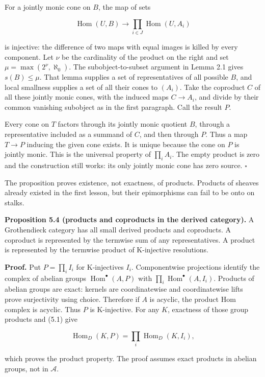 \documentclass[
  english,
  11pt,
  a4paper,
]{article}
\begin{document}
For a jointly monic cone on \(B\), the map of sets

\[\operatorname{Hom}(U,B)\longrightarrow
\prod_{i\in J}\operatorname{Hom}(U,A_i)\]

is injective: the difference of two maps with equal images is killed by
every component. Let \(\nu\) be the cardinality of the product on the
right and set \(\mu=\max(2^\nu,\aleph_0)\). The subobject-to-subset
argument in Lemma 2.1 gives \(s(B)\le\mu\). That lemma supplies a set of
representatives of all possible \(B\), and local smallness supplies a
set of all their cones to \((A_i)\). Take the coproduct \(C\) of all
these jointly monic cones, with the induced maps \(C\to A_i\), and
divide by their common vanishing subobject as in the first paragraph.
Call the result \(P\).

Every cone on \(T\) factors through its jointly monic quotient \(B\),
through a representative included as a summand of \(C\), and then
through \(P\). Thus a map \(T\to P\) inducing the given cone exists. It
is unique because the cone on \(P\) is jointly monic. This is the
universal property of \(\prod_i A_i\). The empty product is zero and the
construction still works: its only jointly monic cone has zero source.
\(\square\)

The proposition proves existence, not exactness, of products. Products
of sheaves already existed in the first lesson, but their epimorphisms
can fail to be onto on stalks.

\textbf{Proposition 5.4 (products and coproducts in the derived
category).} A Grothendieck category has all small derived products and
coproducts. A coproduct is represented by the termwise sum of any
representatives. A product is represented by the termwise product of
K-injective resolutions.

\textbf{Proof.} Put \(P=\prod_i I_i\) for K-injectives \(I_i\).
Componentwise projections identify the complex of abelian groups
\(\operatorname{Hom}^\bullet(A,P)\) with
\(\prod_i\operatorname{Hom}^\bullet(A,I_i)\). Products of abelian groups
are exact: kernels are coordinatewise and coordinatewise lifts prove
surjectivity using choice. Therefore if \(A\) is acyclic, the product
Hom complex is acyclic. Thus \(P\) is K-injective. For any \(K\),
exactness of those group products and (5.1) give

\[\operatorname{Hom}_{D}(K,P)
=\prod_i\operatorname{Hom}_{D}(K,I_i),\]

which proves the product property. The proof assumes exact products in
abelian groups, not in \(\mathcal A\).
\end{document}
